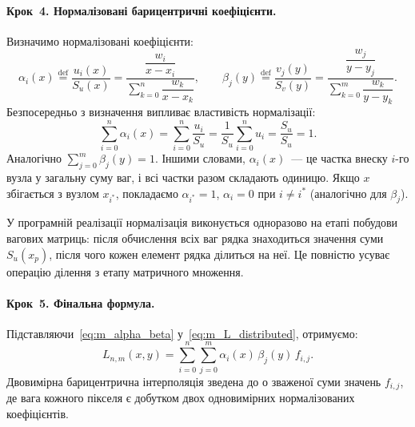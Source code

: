 \paragraph{Крок~4. Нормалізовані барицентричні коефіцієнти.}
Визначимо нормалізовані коефіцієнти:
\begin{equation}\label{eq:m_alpha_beta}
	\alpha_i(x) \stackrel{\text{def}}{=} \frac{u_i(x)}{S_u(x)} = \frac{\dfrac{w_i}{x - x_i}}{\sum\limits_{k=0}^{n} \dfrac{w_k}{x - x_k}}, \qquad
	\beta_j(y) \stackrel{\text{def}}{=} \frac{v_j(y)}{S_v(y)} = \frac{\dfrac{w_j}{y - y_j}}{\sum\limits_{k=0}^{m} \dfrac{w_k}{y - y_k}}.
\end{equation}
Безпосередньо з визначення випливає властивість нормалізації:
\begin{equation}\label{eq:m_norm_proof}
	\sum\limits_{i=0}^{n} \alpha_i(x) = \sum\limits_{i=0}^{n} \frac{u_i}{S_u} = \frac{1}{S_u} \sum\limits_{i=0}^{n} u_i = \frac{S_u}{S_u} = 1.
\end{equation}
Аналогічно $\sum_{j=0}^{m} \beta_j(y) = 1$. Іншими словами, $\alpha_i(x)$~--- це частка внеску $i$-го вузла у загальну суму ваг, і всі частки разом складають одиницю. Якщо $x$ збігається з вузлом $x_{i^*}$, покладаємо $\alpha_{i^*} = 1$, $\alpha_i = 0$ при $i \neq i^*$ (аналогічно для $\beta_j$).

У програмній реалізації нормалізація виконується одноразово на етапі
побудови вагових матриць: після обчислення всіх ваг
рядка знаходиться значення суми
$S_u(x_p)$, після чого кожен елемент рядка
ділиться на неї. Це повністю усуває операцію ділення з етапу
матричного множення.

\paragraph{Крок~5. Фінальна формула.}
Підставляючи~\eqref{eq:m_alpha_beta} у~\eqref{eq:m_L_distributed}, отримуємо:
\begin{equation}\label{eq:m_bilinear}
	L_{n,m}(x, y) = \sum\limits_{i=0}^{n}\sum\limits_{j=0}^{m} \alpha_i(x)\,\beta_j(y)\, f_{i,j}.
\end{equation}
Двовимірна барицентрична інтерполяція зведена до о зваженої суми значень $f_{i,j}$, де вага кожного пікселя є добутком двох одновимірних нормалізованих коефіцієнтів.

